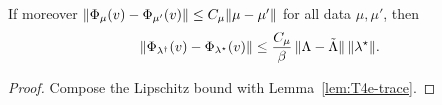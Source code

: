 \begin{corollary}\label{cor:T4e-sigma}
  \leanok
  If moreover $\lVert \Phi_\mu(v)-\Phi_{\mu'}(v)\rVert\le C_\mu\lVert \mu-\mu'\rVert$ for all
  data $\mu,\mu'$, then
  \[
    \lVert \Phi_{\lambda^\dagger}(v)-\Phi_{\lambda^\star}(v)\rVert
      \le\frac{C_\mu}{\beta}\,\lVert \Lambda-\tilde\Lambda\rVert\,\lVert \lambda^\star\rVert.
  \]
\end{corollary}

\begin{proof}
  \leanok
  Compose the Lipschitz bound with Lemma~\ref{lem:T4e-trace}.
\end{proof}
